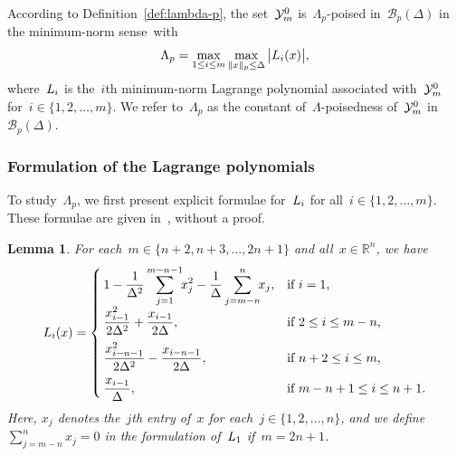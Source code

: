 \documentclass[draft]{article}
\numberwithin{equation}{section}
\theoremstyle{definition}
\theoremstyle{plain}
\newtheorem{lemma}{Lemma}[section]
\theoremstyle{remark}
\newcommand*{\abs}[2][]{#1\lvert#2#1\rvert}
\newcommand*{\lagp}[1][]{L\ifblank{#1}{}{_{#1}}}
\newcommand*{\norm}[2][]{#1\lVert#2#1\rVert}
\newcommand*{\R}{\mathbb{R}}
\newcommand*{\set}[2][]{#1\{#2#1\}}
\newcommand*{\xpt}[1][]{\mathcal{Y}\ifblank{#1}{}{^{#1}}}
\begin{document}
According to Definition~\ref{def:lambda-p}, the set~$\xpt[0]_m$ is~$\Lambda_p$-poised in~$\mathcal{B} _p(\Delta)$ in the minimum-norm sense~with
\begin{equation}
    \label{eq:Lambdap}
    \Lambda_p = \max_{1 \le i \le m} \max_{\norm{x}_p \le \Delta} \abs[\big]{\lagp[i](x)},
\end{equation}
where~$\lagp[i]$ is the~$i$th minimum-norm Lagrange polynomial associated with~$\xpt[0]_m$ for~$i \in \set{1, 2, \dots, m}$.
We refer to~$\Lambda_p$ as the constant of~$\Lambda$-poisedness of~$\xpt[0]_m$ in~$\mathcal{B}_p(\Delta)$.

\subsubsection{Formulation of the Lagrange polynomials}

To study~$\Lambda_p$, we first present explicit formulae for~$\lagp[i]$ for all~$i \in \set{1, 2, \dots, m}$.
These formulae are given in~\cite[\S~3]{Powell_2006}, without a proof.

\begin{lemma}
    \label{lem:lagp}
    For each~$m \in \set{n + 2, n + 3, \dots,  2n + 1}$ and all~$x \in \R^n$, we have
    \begin{equation*}
        \lagp[i](x) =
        \begin{cases}
            \displaystyle 1 - \frac{1}{\Delta^2} \sum_{j = 1}^{m - n - 1} \!\! x_j^2 - \frac{1}{\Delta} \sum_{j = m - n}^n \!\! x_j,    & \text{if~$i = 1$,}\\[2ex]
            \displaystyle \frac{x_{i - 1}^2}{2\Delta^2} + \frac{x_{i - 1}}{2\Delta},                                                    & \text{if~$2 \le i \le m - n$,}\\[2ex]
            \displaystyle \frac{x_{i -n - 1}^2}{2\Delta^2} - \frac{x_{i -n- 1}}{2\Delta},                                               & \text{if~$n+2\le i \le m$,}\\[2ex]
            \displaystyle \frac{x_{i - 1}}{\Delta},                                                                                     & \text{if~$m - n + 1 \le i \le n + 1$.}
        \end{cases}
    \end{equation*}
    Here, $x_j$ denotes the~$j$th entry of~$x$ for each~$j\in\{1,2, \dots, n\}$, and we define~$\sum_{j = m - n}^n x_j = 0$ in the
    formulation of~$\lagp[1]$ if~$m = 2n+1$.
\end{lemma}
\end{document}
